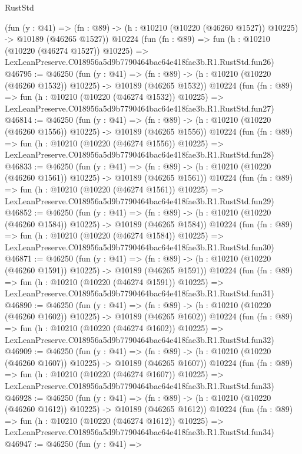 \begin{lexlean}{RustStd}
\begin{coremodule}
    (fun (y : @41) =>
    (fn : @89) -> (h : @10210 (@10220 (@46260 @1527)) @10225) -> @10189 (@46265 @1527))
    @10224
    (fun (fn : @89) =>
    fun (h : @10210 (@10220 (@46274 @1527)) @10225) =>
    LexLeanPreserve.C018956a5d9b7790464bac64e418fae3b.R1.RustStd.fun26)
@46795 := @46250
    (fun (y : @41) =>
    (fn : @89) -> (h : @10210 (@10220 (@46260 @1532)) @10225) -> @10189 (@46265 @1532))
    @10224
    (fun (fn : @89) =>
    fun (h : @10210 (@10220 (@46274 @1532)) @10225) =>
    LexLeanPreserve.C018956a5d9b7790464bac64e418fae3b.R1.RustStd.fun27)
@46814 := @46250
    (fun (y : @41) =>
    (fn : @89) -> (h : @10210 (@10220 (@46260 @1556)) @10225) -> @10189 (@46265 @1556))
    @10224
    (fun (fn : @89) =>
    fun (h : @10210 (@10220 (@46274 @1556)) @10225) =>
    LexLeanPreserve.C018956a5d9b7790464bac64e418fae3b.R1.RustStd.fun28)
@46833 := @46250
    (fun (y : @41) =>
    (fn : @89) -> (h : @10210 (@10220 (@46260 @1561)) @10225) -> @10189 (@46265 @1561))
    @10224
    (fun (fn : @89) =>
    fun (h : @10210 (@10220 (@46274 @1561)) @10225) =>
    LexLeanPreserve.C018956a5d9b7790464bac64e418fae3b.R1.RustStd.fun29)
@46852 := @46250
    (fun (y : @41) =>
    (fn : @89) -> (h : @10210 (@10220 (@46260 @1584)) @10225) -> @10189 (@46265 @1584))
    @10224
    (fun (fn : @89) =>
    fun (h : @10210 (@10220 (@46274 @1584)) @10225) =>
    LexLeanPreserve.C018956a5d9b7790464bac64e418fae3b.R1.RustStd.fun30)
@46871 := @46250
    (fun (y : @41) =>
    (fn : @89) -> (h : @10210 (@10220 (@46260 @1591)) @10225) -> @10189 (@46265 @1591))
    @10224
    (fun (fn : @89) =>
    fun (h : @10210 (@10220 (@46274 @1591)) @10225) =>
    LexLeanPreserve.C018956a5d9b7790464bac64e418fae3b.R1.RustStd.fun31)
@46890 := @46250
    (fun (y : @41) =>
    (fn : @89) -> (h : @10210 (@10220 (@46260 @1602)) @10225) -> @10189 (@46265 @1602))
    @10224
    (fun (fn : @89) =>
    fun (h : @10210 (@10220 (@46274 @1602)) @10225) =>
    LexLeanPreserve.C018956a5d9b7790464bac64e418fae3b.R1.RustStd.fun32)
@46909 := @46250
    (fun (y : @41) =>
    (fn : @89) -> (h : @10210 (@10220 (@46260 @1607)) @10225) -> @10189 (@46265 @1607))
    @10224
    (fun (fn : @89) =>
    fun (h : @10210 (@10220 (@46274 @1607)) @10225) =>
    LexLeanPreserve.C018956a5d9b7790464bac64e418fae3b.R1.RustStd.fun33)
@46928 := @46250
    (fun (y : @41) =>
    (fn : @89) -> (h : @10210 (@10220 (@46260 @1612)) @10225) -> @10189 (@46265 @1612))
    @10224
    (fun (fn : @89) =>
    fun (h : @10210 (@10220 (@46274 @1612)) @10225) =>
    LexLeanPreserve.C018956a5d9b7790464bac64e418fae3b.R1.RustStd.fun34)
@46947 := @46250
    (fun (y : @41) =>

\end{coremodule}
\end{lexlean}
